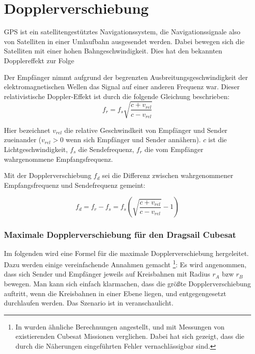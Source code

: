 \section{Dopplerverschiebung}
GPS ist ein satellitengestütztes Navigationssystem, die Navigationssignale also von Satelliten in einer Umlaufbahn ausgesendet werden. Dabei bewegen sich die Satelliten mit einer hohen Bahngeschwindigkeit. Dies hat den bekannten Dopplereffekt zur Folge

Der Empfänger nimmt aufgrund der begrenzten Ausbreitungsgeschwindigkeit der elektromagnetischen Wellen das Signal auf einer anderen Frequenz war. Dieser relativistische Doppler-Effekt ist durch die folgende Gleichung beschrieben:
\begin{equation}
    f_r=f_s \sqrt{\frac{c+v_{rel}}{c-v_{rel}}}
\end{equation}

Hier bezeichnet $v_{rel}$ die relative Geschwindkeit von Empfänger und Sender zueinander ($v_{rel}>0$ wenn sich Empfänger und Sender annähern). $c$ ist die Lichtgeschwindigkeit, $f_s$ die Sendefrequenz, $f_r$ die vom Empfänger wahrgenommene Empfangsfrequenz.

Mit der Dopplerverschiebung $f_d$ sei die Differenz zwischen wahrgenommener Empfangsfrequenz und Sendefrequenz gemeint:

\begin{equation}
\label{EqDoppler}
    f_d=f_r-f_s=f_s \left( \sqrt{\frac{c+v_{rel}}{c-v_{rel}}}-1 \right)
\end{equation}

\subsubsection{Maximale Dopplerverschiebung für den Dragsail Cubesat}
Im folgenden wird eine Formel für die  maximale Dopplerverschiebung hergeleitet. 
Dazu werden einige vereinfachende Annahmen gemacht \footnote{In \cite{Birklykke2010} wurden ähnliche Berechnungen angestellt, und mit Messungen von existierenden Cubesat Missionen verglichen. Dabei hat sich gezeigt, dass die durch die Näherungen eingeführten Fehler vernachlässigbar sind.}: Es wird angenommen, dass sich Sender und Empfänger jeweils auf Kreisbahnen mit Radius $r_A$ bzw $r_B$ bewegen. Man kann sich einfach klarmachen, dass die größte Dopplerverschiebung auftritt, wenn die Kreisbahnen in einer Ebene liegen, und entgegengesetzt durchlaufen werden. Das Szenario ist in  veranschaulicht.


